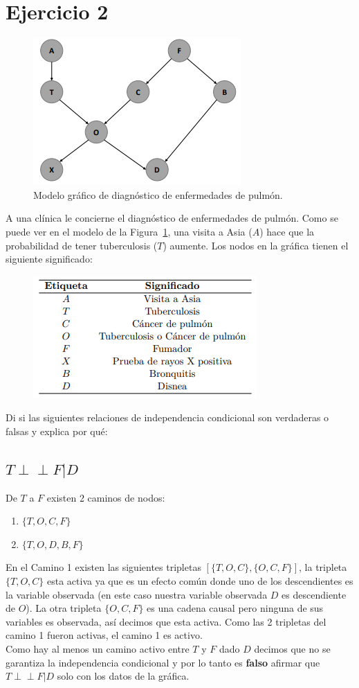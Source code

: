 \documentclass[12pt]{article}
\begin{document}
	\section{Ejercicio 2}	 
	  \begin{figure}[h!]
	  	\centering
	  	\includegraphics[width=.4\linewidth]{excercise2f}
	  	\caption{Modelo gráfico de diagnóstico de enfermedades de pulmón.}
	  	\label{fig1}
	  \end{figure}
	A una clínica le concierne el diagnóstico de enfermedades de pulmón. Como se puede ver en el modelo de la Figura~\ref{fig1}, una visita a Asia ($A$) hace que la probabilidad de tener tuberculosis ($T$) aumente. Los nodos en la gráfica tienen el siguiente significado:	 
	\begin{figure}[h!]
		\centering
		\includegraphics[width=.4\linewidth]{excercise2t}
		\label{table1}
	\end{figure}
Di si las siguientes relaciones de independencia condicional son verdaderas o falsas y explica por qué:
\subsection{$T  \perp\!\!\!\perp F | D$}
De $T$ a $F$ existen 2 caminos de nodos:
\begin{enumerate}
	\item $\{T, O, C, F\}$
	\item $\{T, O, D, B, F\}$
\end{enumerate}
En el Camino 1 existen las siguientes tripletas $[\{T,O,C\},\{O,C,F\}]$, la tripleta $\{T,O,C\}$ esta activa ya que es un efecto común donde uno de los descendientes es la variable observada (en este caso nuestra variable observada $D$ es descendiente de $O$).
La otra tripleta $\{O,C,F\}$ es una cadena causal pero ninguna de sus variables es observada, así decimos que esta activa. Como las 2 tripletas del camino 1 fueron activas, el camino 1 es activo. \\
Como hay al menos un camino activo entre $T$ y $F$ dado $D$ decimos que no se garantiza la independencia condicional y por lo tanto es \textbf{falso} afirmar que $T  \perp\!\!\!\perp F | D$ solo con los datos de la gráfica.
\end{document}
